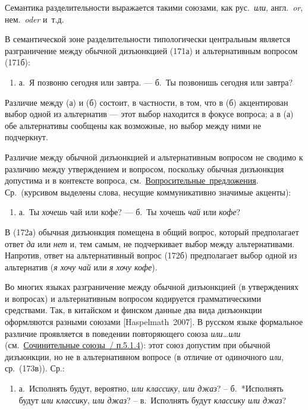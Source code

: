 Семантика разделительности выражается такими союзами, как
рус.~\textit{или}, англ.~\textit{or}, нем.~\textit{oder} и~т.д.

В семантической зоне разделительности типологически центральным является
разграничение между обычной дизъюнкцией (171а) и альтернативным вопросом
(171б):

\begin{enumerate}
\def\labelenumi{(\arabic{enumi})}
\setcounter{enumi}{170}
\item
  а.~Я позвоню сегодня или завтра. --- б.~Ты позвонишь сегодня или
  завтра?
\end{enumerate}

Различие между (а) и (б) состоит, в частности, в том, что в (б)
акцентирован выбор одной из альтернатив --- этот выбор находится в фокусе
вопроса; а в (а) обе альтернативы сообщены как возможные, но выбор между
ними не подчеркнут.

Различие между обычной дизъюнкцией и альтернативным вопросом не сводимо
к различию между утверждением и вопросом, поскольку обычная дизъюнкция
допустима и в контексте вопроса,
см.~\underline{Вопросительные~предложения}. Ср.~(курсивом выделены
слова, несущие коммуникативно значимые акценты):

\begin{enumerate}
\def\labelenumi{(\arabic{enumi})}
\setcounter{enumi}{171}
\item
  а.~Ты \textit{хочешь} чай или кофе? --- б.~Ты хочешь \textit{чай} или
  \textit{кофе}?
\end{enumerate}

В (172а) обычная дизъюнкция помещена в общий вопрос, который
предполагает ответ \textit{да} или \textit{нет} и, тем самым, не
подчеркивает выбор между альтернативами. Напротив, ответ на
альтернативный вопрос (172б) предполагает выбор одной из альтернатив
(\textit{я хочу чай} или \textit{я хочу кофе}).

Во многих языках разграничение между обычной дизъюнкцией (в утверждениях
и вопросах) и альтернативным вопросом кодируется грамматическими
средствами. Так, в китайском и финском данные два вида дизъюнкции
оформляются разными союзами {[}Haspelmath~2007{]}. В русском языке
формальное различие проявляется в поведении повторяющего союза
\textit{или\ldots или} (см.~\underline{Сочинительные союзы~/ п.5.1.4}):
этот союз допустим при обычной дизъюнкции, но не в альтернативном
вопросе (в отличие от одиночного \textit{или}, ср.~(173в)). Ср.:

\begin{enumerate}
\def\labelenumi{(\arabic{enumi})}
\setcounter{enumi}{172}
\item
  а.~Исполнять будут, вероятно, \textit{или классику}, \textit{или джаз}? --
  б.~*Исполнять будут \textit{или классику}, \textit{или джаз}? --
  в.~Исполнять будут \textit{классику или джаз}?
\end{enumerate}

